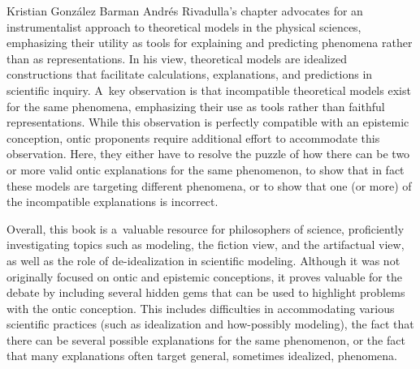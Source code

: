 \begin{recengenv}{Kristian González Barman}
\enlargethispage{1.5\baselineskip}
Andrés Rivadulla's chapter advocates for an instrumentalist approach to theoretical models in the physical sciences, emphasizing their utility as tools for explaining and predicting phenomena rather than as representations. In his view, theoretical models are idealized constructions that facilitate calculations, explanations, and predictions in scientific inquiry. A~key observation is that incompatible theoretical models exist for the same phenomena, emphasizing their use as tools rather than faithful representations. While this observation is perfectly compatible with an epistemic conception, ontic proponents require additional effort to accommodate this observation. Here, they either have to resolve the puzzle of how there can be two or more valid ontic explanations for the same phenomenon, to show that in fact these models are targeting different phenomena, or to show that one (or more) of the incompatible explanations is incorrect.

Overall, this book is a~valuable resource for philosophers of science, proficiently investigating topics such as modeling, the fiction view, and the artifactual view, as well as the role of de-idealization in scientific modeling. Although it was not originally focused on ontic and epistemic conceptions, it proves valuable for the debate by including several hidden gems that can be used to highlight problems with the ontic conception. This includes difficulties in accommodating various scientific practices (such as idealization and how-possibly modeling), the fact that there can be several possible explanations for the same phenomenon, or the fact that many explanations often target general, sometimes idealized, phenomena.




\end{recengenv}
